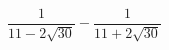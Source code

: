 \begin{ex}[type=calculate]
	\begin{condition}
		\( \dfrac{1}{11-2\sqrt{30}}-\dfrac{1}{11+2\sqrt{30}} \)
	\end{condition}
\end{ex}